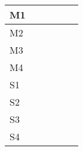 \documentclass[a4paper,oneside,landscape,10pt]{article}
\begin{document}
\begin{tabular}{|p{1cm}|p{5cm}|p{5cm}|p{5cm}|p{5cm}|p{4.8cm}|} \hline
M1&  &  &  &  &  \\ \hline
M2& &  &  &  &  \\ \hline 

M3& &  &  &  &  \\ \hline 

M4& &  &  &  &  \\ \hline

S1 & &  &  &  &  \\ \hline

S2 & &  &  &  &  \\ \hline
S3& &  &  &  &  \\ \hline 
S4 & &  &  &  &  \\ \hline 
\end{tabular}
\end{document}
